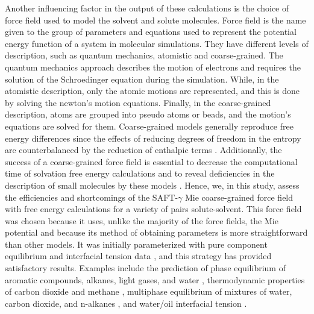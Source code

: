 {Another influencing factor in the output of these calculations is the choice of force field used to model the solvent and solute molecules. Force field is the name given to the group of parameters and equations used to represent the potential energy function of a system in molecular simulations. They have different levels of description, such as quantum mechanics, atomistic and coarse-grained. The quantum mechanics approach describes the motion of electrons and requires the solution of the Schroedinger equation during the simulation. While, in the atomistic description, only the atomic motions are represented,  and this is done by solving the newton's motion equations. Finally, in the coarse-grained description, atoms are grouped into pseudo atoms or beads, and the motion's equations are solved for them. Coarse-grained models generally reproduce free energy differences since the effects of reducing degrees of freedom in the entropy are counterbalanced by the reduction of enthalpic terms \cite{kmiecik2016}. Additionally, the success of a coarse-grained force field is essential to decrease the computational time of solvation free energy calculations and to reveal deficiencies in the description of small molecules by these models \cite{mobley2007,shirts2013}. Hence, we, in this study, assess the efficiencies and shortcomings of the SAFT-$\gamma$ Mie coarse-grained force field  \cite{avendano2011} with free energy calculations for a variety of pairs solute-solvent. This force field was chosen because it uses, unlike the majority of the force fields, the Mie potential \cite{MIE} and because its method of obtaining parameters is more straightforward than other models. It was initially parameterized with pure component equilibrium and interfacial tension data \cite{avendano2011}, and this strategy has provided satisfactory results. Examples include the prediction of phase equilibrium of aromatic compounds, alkanes, light gases, and water \cite{herdes2015,muller2017,lobanova2015}, thermodynamic properties of carbon dioxide and methane \cite{cassiano1}, multiphase equilibrium of mixtures of water, carbon dioxide, and n-alkanes \cite{lobanova2016}, and water/oil interfacial tension \cite{herdes2017}.} 


